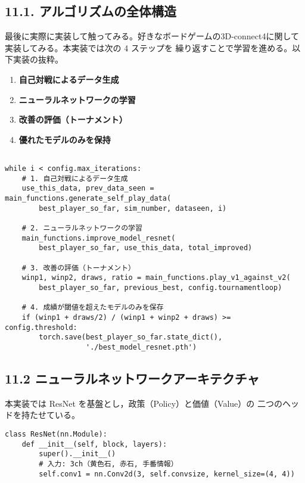 \documentclass[a4paper,12pt]{article}
\begin{document}
\begin{CJK}{UTF8}{min}
\subsection*{11.1.  アルゴリズムの全体構造}

最後に実際に実装して触ってみる。好きなボードゲームの3D-connect4に関して実装してみる。本実装では次の 4 ステップを
繰り返すことで学習を進める。以下実装の抜粋。

\begin{enumerate}
  \item \textbf{自己対戦によるデータ生成}
  \item \textbf{ニューラルネットワークの学習}
  \item \textbf{改善の評価（トーナメント）}
  \item \textbf{優れたモデルのみを保持}
\end{enumerate}

\begin{lstlisting}[caption={\texttt{Main.py} の主要ループ（69--157 行目，抜粋）}]

while i < config.max_iterations:
    # 1. 自己対戦によるデータ生成
    use_this_data, prev_data_seen = main_functions.generate_self_play_data(
        best_player_so_far, sim_number, dataseen, i)

    # 2. ニューラルネットワークの学習
    main_functions.improve_model_resnet(
        best_player_so_far, use_this_data, total_improved)

    # 3. 改善の評価（トーナメント）
    winp1, winp2, draws, ratio = main_functions.play_v1_against_v2(
        best_player_so_far, previous_best, config.tournamentloop)

    # 4. 成績が閾値を超えたモデルのみを保存
    if (winp1 + draws/2) / (winp1 + winp2 + draws) >= config.threshold:
        torch.save(best_player_so_far.state_dict(),
                   './best_model_resnet.pth')
\end{lstlisting}

\subsection*{11.2 ニューラルネットワークアーキテクチャ}

本実装では ResNet を基盤とし，政策（Policy）と価値（Value）の
二つのヘッドを持たせている。

\begin{lstlisting}[caption={\texttt{ResNet.py} の骨子（63--177 行目，抜粋）}]
class ResNet(nn.Module):
    def __init__(self, block, layers):
        super().__init__()
        # 入力: 3ch（黄色石, 赤石, 手番情報）
        self.conv1 = nn.Conv2d(3, self.convsize, kernel_size=(4, 4))


\end{lstlisting}
\end{CJK}
\end{document}
